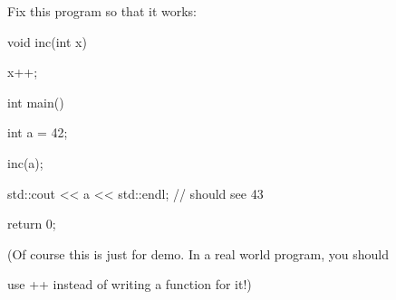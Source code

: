 Fix this program so that it works:



\begin{consolethree}[escapeinside=||]

void inc(int x)

{

    x++;

}



int main()

{

    int a = 42;

    inc(a);

    std::cout << a << std::endl; // should see 43

    return 0;

}

\end{consolethree}



(Of course this is just for demo. In a real world program, you should

use ++ instead of writing a function for it!)

